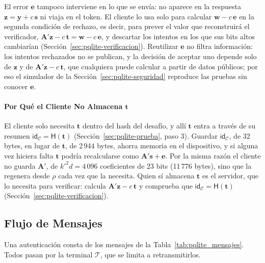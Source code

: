 El error $\mathbf{e}$ tampoco interviene en lo que se envía: no aparece en la respuesta $\mathbf{z} = \mathbf{y} + c\,\mathbf{s}$ ni viaja en el token. El cliente lo usa solo para calcular $\mathbf{w} - c\,\mathbf{e}$ en la segunda condición de rechazo, es decir, para prever el valor que reconstruirá el verificador, $\mathbf{A}'\mathbf{z} - c\,\mathbf{t} = \mathbf{w} - c\,\mathbf{e}$, y descartar los intentos en los que sus bits altos cambiarían (Sección~\ref{sec:pqlite-verificacion}). Reutilizar $\mathbf{e}$ no filtra información: los intentos rechazados no se publican, y la decisión de aceptar uno depende solo de $\mathbf{z}$ y de $\mathbf{A}'\mathbf{z} - c\,\mathbf{t}$, que cualquiera puede calcular a partir de datos públicos; por eso el simulador de la Sección~\ref{sec:pqlite-seguridad} reproduce las pruebas sin conocer $\mathbf{e}$.

\paragraph{Por Qué el Cliente No Almacena $\mathbf{t}$}
El cliente solo necesita $\mathbf{t}$ dentro del hash del desafío, y allí $\mathbf{t}$ entra a través de su resumen $\mathsf{id}_{\mathcal{C}} = \mathsf{H}(\mathbf{t})$ (Sección~\ref{sec:pqlite-prueba}, paso 3). Guardar $\mathsf{id}_{\mathcal{C}}$, de 32 bytes, en lugar de $\mathbf{t}$, de 2\,944 bytes, ahorra memoria en el dispositivo, y si alguna vez hiciera falta $\mathbf{t}$ podría recalcularse como $\mathbf{A}'\mathbf{s} + \mathbf{e}$. Por la misma razón el cliente no guarda $\mathbf{A}'$, de $k'^2 d = 4\,096$ coeficientes de 23 bits (11\,776 bytes), sino que la regenera desde $\rho$ cada vez que la necesita. Quien sí almacena $\mathbf{t}$ es el servidor, que lo necesita para verificar: calcula $\mathbf{A}'\mathbf{z} - c\,\mathbf{t}$ y comprueba que $\mathsf{id}_{\mathcal{C}} = \mathsf{H}(\mathbf{t})$ (Sección~\ref{sec:pqlite-verificacion}).

\subsection{Flujo de Mensajes}
\label{sec:pqlite-flujo}

Una autenticación consta de los mensajes de la Tabla~\ref{tab:pqlite_mensajes}. Todos pasan por la terminal $\mathcal{T}$, que se limita a retransmitirlos.


